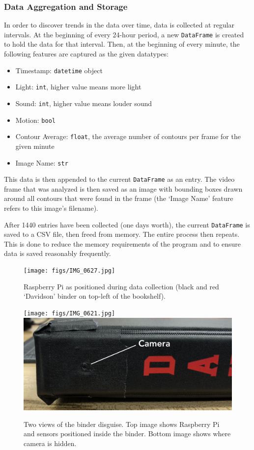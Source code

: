 \subsubsection{Data Aggregation and Storage}
In order to discover trends in the data over time, data is collected at regular intervals. At the beginning of every 24-hour period, a new \texttt{DataFrame} \cite{mckinney2014pandas} is created to hold the data for that interval. Then, at the beginning of every minute, the following features are captured as the given datatypes:
\begin{itemize}
    \item Timestamp: \texttt{datetime} object
    \item Light: \texttt{int}, higher value means more light
    \item Sound: \texttt{int}, higher value means louder sound
    \item Motion: \texttt{bool}
    \item Contour Average: \texttt{float}, the average number of contours per frame for the given minute
    \item Image Name: \texttt{str}
\end{itemize}
This data is then appended to the current \texttt{DataFrame} as an entry. The video frame that was analyzed is then saved as an image with bounding boxes drawn around all contours that were found in the frame (the `Image Name' feature refers to this image's filename).

After 1440 entries have been collected (one days worth), the current \texttt{DataFrame} is saved to a CSV file, then freed from memory. The entire process then repeats. This is done to reduce the memory requirements of the program and to ensure data is saved reasonably frequently.

\begin{figure}[h]
    \centering
    \texttt{[image: figs/IMG\_0627.jpg]}
    \caption{Raspberry Pi as positioned during data collection (black and red `Davidson' binder on top-left of the bookshelf).}
    \label{fig:disguised}
\end{figure}

\begin{figure}[h]
    \centering
    \texttt{[image: figs/IMG\_0621.jpg]}\\
    \vspace{2mm}
    \includegraphics[width=0.97\linewidth]{figs/IMG_0622.jpg}
    \caption{Two views of the binder disguise. Top image shows Raspberry Pi and sensors positioned inside the binder. Bottom image shows where camera is hidden.}
    \label{fig:binder}
\end{figure}

